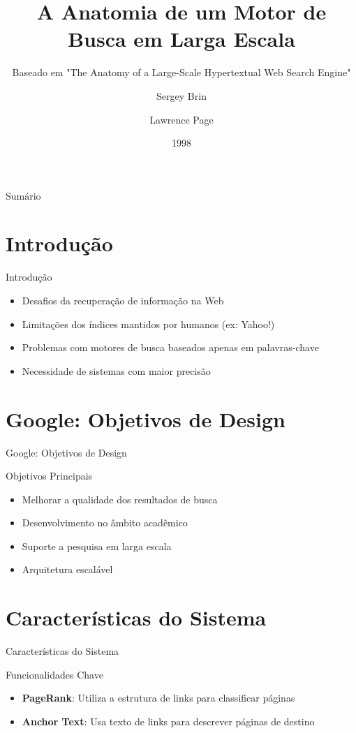 \documentclass{beamer}
\title{A Anatomia de um Motor de Busca em Larga Escala}
\subtitle{Baseado em "The Anatomy of a Large-Scale Hypertextual Web Search Engine"}
\author{Sergey Brin \and Lawrence Page}
\institute{Stanford University}
\date{1998}
\begin{document}
\begin{frame}
    \titlepage
\end{frame}

\begin{frame}{Sumário}
    \tableofcontents
\end{frame}

\section{Introdução}
\begin{frame}{Introdução}
    \begin{itemize}
        \item Desafios da recuperação de informação na Web
        \item Limitações dos índices mantidos por humanos (ex: Yahoo!)
        \item Problemas com motores de busca baseados apenas em palavras-chave
        \item Necessidade de sistemas com maior precisão
    \end{itemize}
\end{frame}

\section{Google: Objetivos de Design}
\begin{frame}{Google: Objetivos de Design}
    \begin{block}{Objetivos Principais}
        \begin{itemize}
            \item Melhorar a qualidade dos resultados de busca
            \item Desenvolvimento no âmbito acadêmico
            \item Suporte a pesquisa em larga escala
            \item Arquitetura escalável
        \end{itemize}
    \end{block}
\end{frame}

\section{Características do Sistema}
\begin{frame}{Características do Sistema}
    \begin{block}{Funcionalidades Chave}
        \begin{itemize}
            \item \textbf{PageRank}: Utiliza a estrutura de links para classificar páginas
            \item \textbf{Anchor Text}: Usa texto de links para descrever páginas de destino
        \end{itemize}
    \end{block}
\end{frame}
\end{document}
